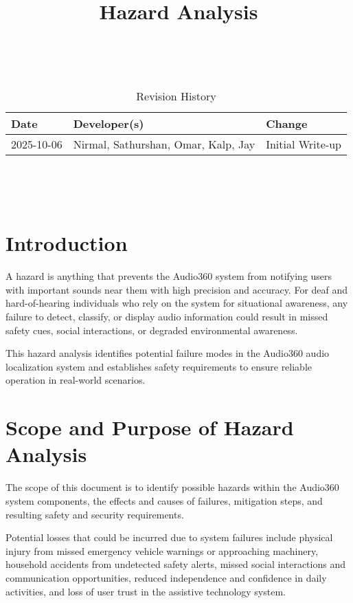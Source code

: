 \documentclass{article}
\title{Hazard Analysis\\\progname}
\author{\authname}
\date{}
\begin{document}
\maketitle
\thispagestyle{empty}

~\newpage


\begin{table}[hp]
\caption{Revision History} \label{TblRevisionHistory}
\begin{tabularx}{\textwidth}{llX}
\toprule
\textbf{Date} & \textbf{Developer(s)} & \textbf{Change}\\
\midrule
2025-10-06 &  Nirmal, Sathurshan, Omar, Kalp, Jay & Initial Write-up\\
\bottomrule
\end{tabularx}
\end{table}

~\newpage

\tableofcontents

~\newpage


\section{Introduction}

A hazard is anything that prevents the Audio360 system from notifying users with
important sounds near them with high precision and accuracy. For deaf and
hard-of-hearing individuals who rely on the system for situational awareness,
any failure to detect, classify, or display audio information could result in
missed safety cues, social interactions, or degraded environmental awareness.

This hazard analysis identifies potential failure modes in the Audio360 audio
localization system and establishes safety requirements to ensure reliable
operation in real-world scenarios.

\section{Scope and Purpose of Hazard Analysis}

The scope of this document is to identify possible hazards within the Audio360
system components, the effects and causes of failures, mitigation steps, and
resulting safety and security requirements.

Potential losses that could be incurred due to system failures include physical
injury from missed emergency vehicle warnings or approaching machinery,
household accidents from undetected safety alerts, missed social interactions
and communication opportunities, reduced independence and confidence in daily
activities, and loss of user trust in the assistive technology system.
\end{document}
